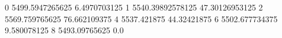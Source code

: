 0 5499.5947265625 6.4970703125
1 5540.39892578125 47.30126953125
2 5569.759765625 76.662109375
4 5537.421875 44.32421875
6 5502.677734375 9.580078125
8 5493.09765625 0.0
